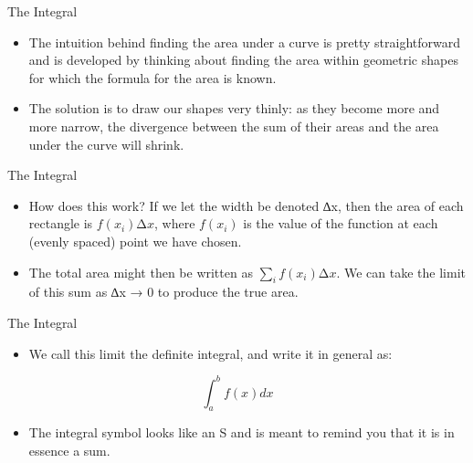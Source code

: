 \documentclass[
  ignorenonframetext,
]{beamer}
\providecommand{\tightlist}{%
  \setlength{\itemsep}{0pt}\setlength{\parskip}{0pt}}
\begin{document}
\begin{frame}{The Integral}
\protect\hypertarget{the-integral-1}{}

\begin{itemize}
\item
  The intuition behind finding the area under a curve is pretty
  straightforward and is developed by thinking about finding the area
  within geometric shapes for which the formula for the area is known.
\item
  The solution is to draw our shapes very thinly: as they become more
  and more narrow, the divergence between the sum of their areas and the
  area under the curve will shrink.
\end{itemize}

\end{frame}

\begin{frame}{The Integral}
\protect\hypertarget{the-integral-2}{}

\begin{itemize}
\item
  How does this work? If we let the width be denoted ∆x, then the area
  of each rectangle is \(f(x_{i})∆x\), where \(f(x_{i})\) is the value
  of the function at each (evenly spaced) point we have chosen.
\item
  The total area might then be written as \(\sum_{i}f(x_i)∆x\). We can
  take the limit of this sum as ∆x → 0 to produce the true area.
\end{itemize}

\end{frame}

\begin{frame}{The Integral}
\protect\hypertarget{the-integral-3}{}

\begin{itemize}
\tightlist
\item
  We call this limit the definite integral, and write it in general as:
\end{itemize}

\[\int_{a}^{b}f(x)dx\]

\begin{itemize}
\tightlist
\item
  The integral symbol looks like an S and is meant to remind you that it
  is in essence a sum.
\end{itemize}

\end{frame}
\end{document}
